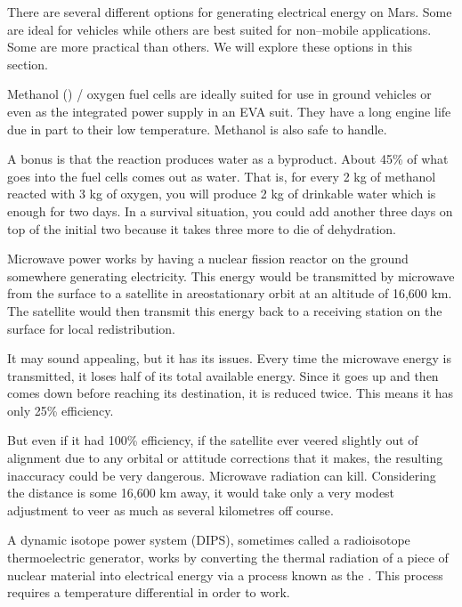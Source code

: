 

There are several different options for generating electrical energy on Mars. Some are ideal for vehicles while others are best suited for non--mobile applications. Some are more practical than others. We will explore these options in this section.

Methanol () / oxygen fuel cells are ideally suited for use in ground vehicles or even as the integrated power supply in an EVA suit. They have a long engine life due in part to their low temperature. Methanol is also safe to handle. 

A bonus is that the reaction produces water as a byproduct. About 45\% of what goes into the fuel cells comes out as water. That is, for every 2 kg of methanol reacted with 3 kg of oxygen, you will produce 2 kg of drinkable water which is enough for two days. In a survival situation, you could add another three days on top of the initial two because it takes three more to die of dehydration.

Microwave power works by having a nuclear fission reactor on the ground somewhere generating electricity. This energy would be transmitted by microwave from the surface to a satellite in areostationary orbit at an altitude of 16,600 km. The satellite would then transmit this energy back to a receiving station on the surface for local redistribution.

It may sound appealing, but it has its issues. Every time the microwave energy is transmitted, it loses half of its total available energy. Since it goes up and then comes down before reaching its destination, it is reduced twice. This means it has only 25\% efficiency.

But even if it had 100\% efficiency, if the satellite ever veered slightly out of alignment due to any orbital or attitude corrections that it makes, the resulting inaccuracy could be very dangerous. Microwave radiation can kill. Considering the distance is some 16,600 km away, it would take only a very modest adjustment to veer as much as several kilometres off course.

A dynamic isotope power system (DIPS), sometimes called a radioisotope thermoelectric generator, works by converting the thermal radiation of a piece of nuclear material into electrical energy via a process known as the . This process requires a temperature differential in order to work.

